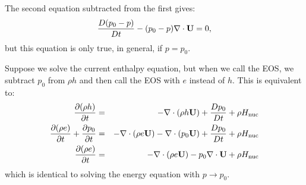 The second equation subtracted from the first gives:
\begin{equation} \label{eq:difference between h and e equations}
  \frac{D (p_0 - p)}{Dt} - (p_0 - p)  \nabla \cdot {\bf U} = 0,
\end{equation}
but this equation is only true, in general, if $p=p_0$.

Suppose we solve the current enthalpy equation, but when we call the EOS, we 
subtract $p_0$ from $\rho h$ and then call the EOS with $e$ instead of $h$.  This is equivalent
to:
\begin{eqnarray}
\frac{\partial(\rho h)}{\partial t} &=& -\nabla\cdot(\rho h\Ub) +
  \frac{Dp_0}{Dt} + \rho\Hnuc \nonumber \\
%
\frac{\partial(\rho e)}{\partial t} + \frac{\partial p_0}{\partial t} &=&
 -\nabla\cdot(\rho e\Ub) -\nabla\cdot(p_0 \Ub) + \frac{Dp_0}{Dt} + \rho\Hnuc \nonumber \\
%
\frac{\partial(\rho e)}{\partial t} &=&
 -\nabla\cdot(\rho e\Ub) - p_0 \nabla\cdot\Ub + \rho\Hnuc  \nonumber
\end{eqnarray}
which is identical to solving the energy equation with $p\to p_0$.

